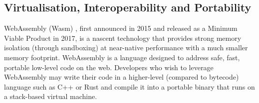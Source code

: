 \subsection{Virtualisation, Interoperability and Portability}\label{sec:virtualization}


WebAssembly (Wasm) \cite{haas2017bringing}, first announced in 2015 and released as a Minimum Viable Product in 2017, is a nascent technology that provides strong memory isolation (through sandboxing) at near-native performance with a much smaller memory footprint. WebAssembly is a language designed to address safe, fast, portable low-level code on the web. Developers who wish to leverage WebAssembly may write their code in a higher-level (compared to bytecode) language such as C++ or Rust and compile it into a portable binary that runs on a stack-based virtual machine.





